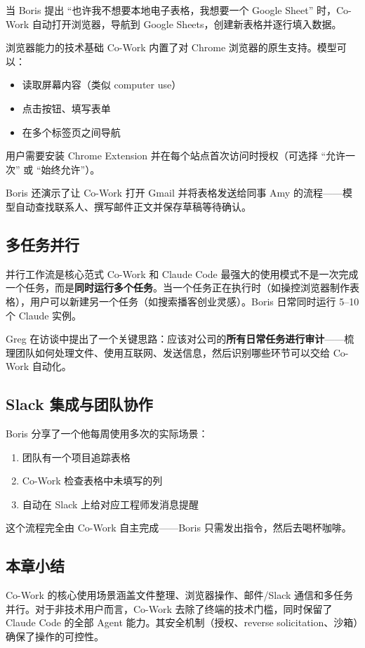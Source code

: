 当 Boris 提出 ``也许我不想要本地电子表格，我想要一个 Google Sheet'' 时，Co-Work 自动打开浏览器，导航到 Google Sheets，创建新表格并逐行填入数据。

\begin{knowledgebox}{浏览器能力的技术基础}
Co-Work 内置了对 Chrome 浏览器的原生支持。模型可以：
\begin{itemize}
    \item 读取屏幕内容（类似 computer use）
    \item 点击按钮、填写表单
    \item 在多个标签页之间导航
\end{itemize}
用户需要安装 Chrome Extension 并在每个站点首次访问时授权（可选择 ``允许一次'' 或 ``始终允许''）。
\end{knowledgebox}

Boris 还演示了让 Co-Work 打开 Gmail 并将表格发送给同事 Amy 的流程——模型自动查找联系人、撰写邮件正文并保存草稿等待确认。

\subsection{多任务并行}

\begin{importantbox}{并行工作流是核心范式}
Co-Work 和 Claude Code 最强大的使用模式不是一次完成一个任务，而是\textbf{同时运行多个任务}。当一个任务正在执行时（如操控浏览器制作表格），用户可以新建另一个任务（如搜索播客创业灵感）。Boris 日常同时运行 5--10 个 Claude 实例。
\end{importantbox}

Greg 在访谈中提出了一个关键思路：应该对公司的\textbf{所有日常任务进行审计}——梳理团队如何处理文件、使用互联网、发送信息，然后识别哪些环节可以交给 Co-Work 自动化。

\subsection{Slack 集成与团队协作}

Boris 分享了一个他每周使用多次的实际场景：

\begin{enumerate}
    \item 团队有一个项目追踪表格
    \item Co-Work 检查表格中未填写的列
    \item 自动在 Slack 上给对应工程师发消息提醒
\end{enumerate}

这个流程完全由 Co-Work 自主完成——Boris 只需发出指令，然后去喝杯咖啡。

\subsection{本章小结}

Co-Work 的核心使用场景涵盖文件整理、浏览器操作、邮件/Slack 通信和多任务并行。对于非技术用户而言，Co-Work 去除了终端的技术门槛，同时保留了 Claude Code 的全部 Agent 能力。其安全机制（授权、reverse solicitation、沙箱）确保了操作的可控性。

